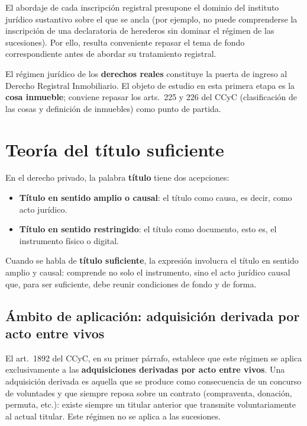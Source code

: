 \documentclass[12pt,oneside]{book}
\begin{document}
El abordaje de cada inscripción registral presupone el dominio del instituto jurídico sustantivo sobre el que se ancla (por ejemplo, no puede comprenderse la inscripción de una declaratoria de herederos sin dominar el régimen de las sucesiones). Por ello, resulta conveniente repasar el tema de fondo correspondiente antes de abordar su tratamiento registral.

El régimen jurídico de los \textbf{derechos reales} constituye la puerta de ingreso al Derecho Registral Inmobiliario. El objeto de estudio en esta primera etapa es la \textbf{cosa inmueble}; conviene repasar los arts.\ 225 y 226 del CCyC (clasificación de las cosas y definición de inmuebles) como punto de partida.

\section{Teoría del título suficiente}

En el derecho privado, la palabra \textbf{título} tiene dos acepciones:

\begin{itemize}
    \item \textbf{Título en sentido amplio o causal}: el título como causa, es decir, como acto jurídico.
    \item \textbf{Título en sentido restringido}: el título como documento, esto es, el instrumento físico o digital.
\end{itemize}

Cuando se habla de \textbf{título suficiente}, la expresión involucra el título en sentido amplio y causal: comprende no solo el instrumento, sino el acto jurídico causal que, para ser suficiente, debe reunir condiciones de fondo y de forma.

\subsection{Ámbito de aplicación: adquisición derivada por acto entre vivos}

El art.\ 1892 del CCyC, en su primer párrafo, establece que este régimen se aplica exclusivamente a las \textbf{adquisiciones derivadas por acto entre vivos}. Una adquisición derivada es aquella que se produce como consecuencia de un concurso de voluntades y que siempre reposa sobre un contrato (compraventa, donación, permuta, etc.): existe siempre un titular anterior que transmite voluntariamente al actual titular. Este régimen no se aplica a las sucesiones.
\end{document}
